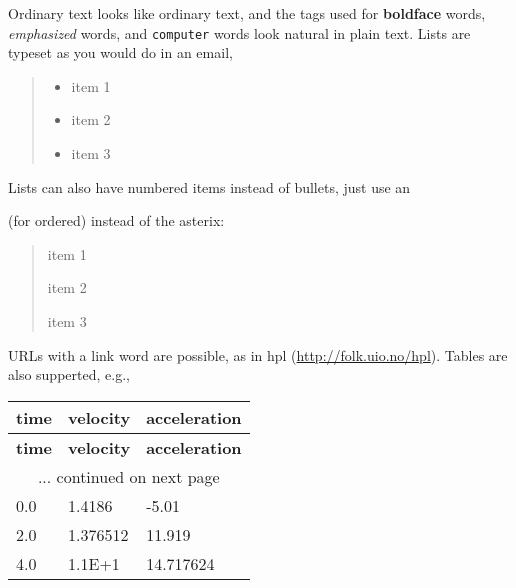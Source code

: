 \documentclass[a4paper,english]{article}
\newlength{\DUtablewidth} %
\begin{document}
Ordinary text looks like ordinary text, and the tags used for
\textbf{boldface} words, \emph{emphasized} words, and \texttt{computer} words look
natural in plain text.  Lists are typeset as you would do in an email,
%
\begin{quote}
%
\begin{itemize}

\item item 1

\item item 2

\item item 3

\end{itemize}

\end{quote}

Lists can also have numbered items instead of bullets, just use an
\setcounter{listcnt0}{0}
\begin{list}{.}
{
\setlength{\rightmargin}{\leftmargin}
}

\item (for ordered) instead of the asterix:
\end{list}
%
\begin{quote}
\setcounter{listcnt0}{0}
\begin{list}{.}
{
\setlength{\rightmargin}{\leftmargin}
}

\item item 1

\item item 2

\item item 3
\end{list}

\end{quote}

URLs with a link word are possible, as in hpl (\url{http://folk.uio.no/hpl}).
Tables are also supperted, e.g.,

\leavevmode
\setlength{\DUtablewidth}{\linewidth}
\begin{longtable}[c]{|p{0.156\DUtablewidth}|p{0.156\DUtablewidth}|p{0.156\DUtablewidth}|}
\hline
\textbf{%
time
} & \textbf{%
velocity
} & \textbf{%
acceleration
} \\
\hline
\endfirsthead
\hline
\textbf{%
time
} & \textbf{%
velocity
} & \textbf{%
acceleration
} \\
\hline
\endhead
\multicolumn{3}{c}{\hfill ... continued on next page} \\
\endfoot
\endlastfoot

0.0
 & 
1.4186
 & 
-5.01
 \\
\hline

2.0
 & 
1.376512
 & 
11.919
 \\
\hline

4.0
 & 
1.1E+1
 & 
14.717624
 \\
\hline
\end{longtable}
\end{document}
